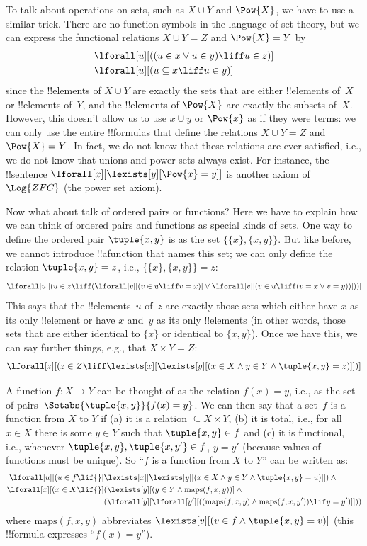 To talk about operations on sets, such as $X \cup Y$ and $\Pow{X}$, we
have to use a similar trick.  There are no function symbols in the
language of set theory, but we can express the functional relations $X
\cup Y = Z$ and $\Pow{X} = Y$ by
\begin{align*}
& \lforall[u][((u \in x \lor u \in y) \liff u \in z)]\\
& \lforall[u][(u \subseteq x \liff u \in y )]
\end{align*}
since the !!{element}s of $X \cup Y$ are exactly the sets that are
either !!{element}s of~$X$ or !!{element}s of~$Y$, and the
!!{element}s of $\Pow{X}$ are exactly the subsets of~$X$.  However,
this doesn't allow us to use $x \cup y$ or $\Pow{x}$ as if they were
terms: we can only use the entire !!{formula}s that define the
relations $X \cup Y = Z$ and $\Pow{X} = Y$. In fact, we do not know
that these relations are ever satisfied, i.e., we do not know that
unions and power sets always exist. For instance, the !!{sentence}
$\lforall[x][\lexists[y][\Pow{x} = y]]$ is another axiom
of~$\Log{ZFC}$ (the power set axiom).

Now what about talk of ordered pairs or functions?  Here we have to
explain how we can think of ordered pairs and functions as special
kinds of sets.  One way to define the ordered pair $\tuple{x, y}$ is
as the set $\{\{x\}, \{x, y\}\}$.  But like before, we cannot
introduce !!a{function} that names this set; we can only define the
relation $\tuple{x, y} = z$, i.e., $\{\{x\}, \{x, y\}\} = z$:
\[
\lforall[u][(u \in z \liff (\lforall[v][(v \in u \liff v = x)] \lor
  \lforall[v][(v \in u \liff (v = x \lor v = y))]))]
\]
This says that the !!{element}s~$u$ of~$z$ are exactly those sets which
either have $x$ as its only !!{element} or have $x$ and~$y$ as its
only !!{element}s (in other words, those sets that are either identical
to $\{x\}$ or identical to $\{x, y\}$).  Once we have this, we can say
further things, e.g., that $X \times Y = Z$:
\[
\lforall[z][(z \in Z \liff \lexists[x][\lexists[y][(x \in
        X \land y \in Y \land \tuple{x, y} = z)]])]
\]

A function $f \colon X \to Y$ can be thought of as the relation $f(x)
= y$, i.e., as the set of pairs~$\Setabs{\tuple{x,y}}{f(x) = y}$. We
can then say that a set~$f$ is a function from $X$ to $Y$ if (a) it is
a relation $\subseteq X \times Y$, (b) it is total, i.e., for all $x
\in X$ there is some $y \in Y$ such that $\tuple{x, y} \in f$ and (c)
it is functional, i.e., whenever $\tuple{x, y}, \tuple{x, y'} \in f$,
$y = y'$ (because values of functions must be unique). So ``$f$ is a
function from $X$ to $Y$'' can be written as:
\begin{align*}
 \lforall[u][(u \in f \lif {}] & \lexists[x][\lexists[y][(x \in X \land y \in
      Y \land \tuple{x, y} = u)]]) \land {}\\
 \lforall[x][(x \in X \lif {}] &
      (\lexists[y][(y \in Y \land \mathrm{maps}(f, x, y))] \land {}\\
& (\lforall[y][\lforall[y'][((\mathrm{maps}(f, x, y) \land
    \mathrm{maps}(f, x, y')) \lif y = y')]]))
\end{align*}
where $\mathrm{maps}(f, x, y)$ abbreviates $\lexists[v][(v \in f \land
  \tuple{x, y} = v)]$ (this !!{formula} expresses ``$f(x) = y$'').


